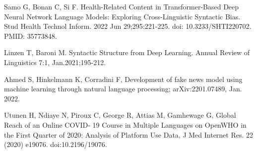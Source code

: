 \documentclass{IOS-Book-Article}
\begin{document}
\vspace{-4mm}
\begin{thebibliography}{99}


Samo G, Bonan C, Si F. Health-Related Content in Transformer-Based Deep Neural Network Language Models: Exploring Cross-Linguistic Syntactic Bias. Stud Health Technol Inform. 2022 Jun 29;295:221-225. doi: 10.3233/SHTI220702. PMID: 35773848.

Linzen T, Baroni M. Syntactic Structure from Deep Learning. Annual Review of Linguistics 7:1,
Jan.2021;195-212.

Ahmed S, Hinkelmann K, Corradini F, Development of fake news model using machine learning through natural language processing; arXiv:2201.07489, Jan. 2022. 
  

Utunen H, Ndiaye N, Piroux C, George R, Attias M, Gamhewage G, Global Reach of an Online COVID-
19 Course in Multiple Languages on OpenWHO in the First Quarter of 2020: Analysis of Platform Use
Data, J Med Internet Res. 22 (2020) e19076. doi:10.2196/19076.

\end{thebibliography}
\end{document}
